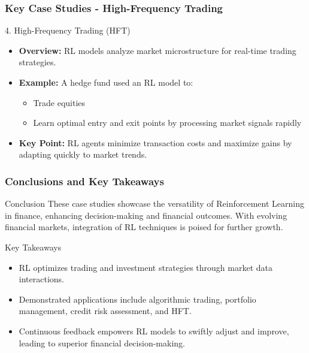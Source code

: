 \documentclass[aspectratio=169]{beamer}
\begin{document}
\begin{frame}[fragile]
    \frametitle{Key Case Studies - High-Frequency Trading}
    \begin{block}{4. High-Frequency Trading (HFT)}
        \begin{itemize}
            \item \textbf{Overview:} RL models analyze market microstructure for real-time trading strategies.
            \item \textbf{Example:} A hedge fund used an RL model to:
            \begin{itemize}
                \item Trade equities
                \item Learn optimal entry and exit points by processing market signals rapidly
            \end{itemize}
            \item \textbf{Key Point:} RL agents minimize transaction costs and maximize gains by adapting quickly to market trends.
        \end{itemize}
    \end{block}
\end{frame}

\begin{frame}[fragile]
    \frametitle{Conclusions and Key Takeaways}
    \begin{block}{Conclusion}
        These case studies showcase the versatility of Reinforcement Learning in finance, enhancing decision-making and financial outcomes. With evolving financial markets, integration of RL techniques is poised for further growth.
    \end{block}

    \begin{block}{Key Takeaways}
        \begin{itemize}
            \item RL optimizes trading and investment strategies through market data interactions.
            \item Demonstrated applications include algorithmic trading, portfolio management, credit risk assessment, and HFT.
            \item Continuous feedback empowers RL models to swiftly adjust and improve, leading to superior financial decision-making.
        \end{itemize}
    \end{block}
\end{frame}
\end{document}
